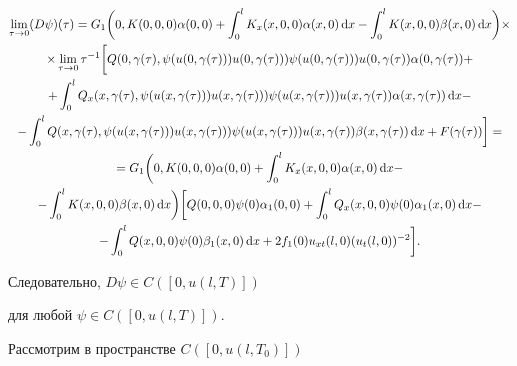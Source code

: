 \begin{multline*}


\lim_{\tau \to 0}(D\psi )(\tau )=


G_1\bigg(0,K(0,0,0)\alpha


(0,0)+\int_0^lK_x(x,0,0)\alpha (x,0)\d x -\int_0^l


K(x,0,0)\beta (x,0)\d x\bigg)\times \\


\times \lim_{\tau \to 0}\tau ^{-1}\bigg[ Q(0,\gamma(\tau ),


\psi (u(0,\gamma (\tau )))u(0,\gamma (\tau )))\psi


(u(0,\gamma (\tau ))) u(0,\gamma (\tau ))\alpha


(0,\gamma (\tau ))+\\


+ \int_0^lQ_x(x,\gamma (\tau ),\psi (u(x,\gamma (\tau)))


u(x,\gamma (\tau )))\psi (u(x,\gamma (\tau )))u(x,\gamma


(\tau )) \alpha (x,\gamma (\tau))\d x-\\


- \int_0^lQ(x,\gamma (\tau ),\psi (u(x,\gamma (\tau )))


u(x,\gamma (\tau)))\psi (u(x,\gamma (\tau


)))u(x,\gamma (\tau )) \beta (x,\gamma (\tau ))\d x +


F(\gamma (\tau ))\bigg]= \\


=G_1\bigg(0,K(0,0,0)\alpha (0,0)+\int_0^lK_x(x,0,0)\alpha


(x,0)\d x-\\


-\int_0^lK(x,0,0)\beta (x,0)\d x\bigg)\bigg[


Q(0,0,0)\psi (0)


\alpha_1(0,0) + \int_0^lQ_x(x,0,0)\psi (0)\alpha_1(x,0)\d x-\\


- \int_0^lQ(x,0,0)\psi (0)\beta_1(x,0)\d x


+2f_1(0)u_{xt}(l,0)(u_t(l,0))^{-2}\bigg].


\end{multline*}


Следовательно, $D\psi \in C([0,u(l,T)])$


для любой $\psi \in C([0,u(l,T)])$.





Рассмотрим в пространстве $C([0,u(l,T_0)])$


